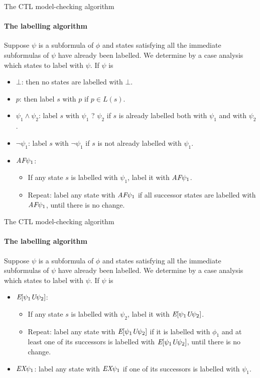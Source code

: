 \begin{frame}{The CTL model-checking algorithm}
	\framesubtitle{The labelling algorithm}
	Suppose $\psi$ is a subformula of $\phi$ and states satisfying all the immediate subformulas of $\psi$ have already been labelled. We determine by a case analysis which states to label with $\psi$. If $\psi$ is
	
	\begin{itemize}
		\item
		{
			$\bot$: then no states are labelled with $\bot$.
			\pause
		}
		\item
		{
			$p$: then label $s$ with $p$ if $p \in L(s)$.
			\pause
		}
		\item
		{
			$\psi_{1} \land \psi_{2}$: label $s$ with $\psi_{1}$ ? $\psi_{2}$ if $s$ is already labelled both with $\psi_{1}$ and with $\psi_{2}$.
			\pause
		}
		\item
		{
			$\neg \psi_{1}$: label $s$ with $\neg \psi_{1}$ if $s$ is not already labelled with $\psi_{1}$.
			\pause
		}
		\item
		{
			$\textit{A}\textit{F} \psi_{1}$:
			\begin{itemize}
				\item If any state $s$ is labelled with $\psi_{1}$, label it with $\textit{A}\textit{F} \psi_{1}$.
				\item Repeat: label any state with $\textit{A}\textit{F} \psi_{1}$ if all successor states are labelled with $\textit{A}\textit{F} \psi_{1}$, until there is no change.
			\end{itemize} 
		}
	\end{itemize} 
\end{frame}

\begin{frame}{The CTL model-checking algorithm}
	\framesubtitle{The labelling algorithm}
	Suppose $\psi$ is a subformula of $\phi$ and states satisfying all the immediate subformulas of $\psi$ have already been labelled. We determine by a case analysis which states to label with $\psi$. If $\psi$ is
	
	\begin{itemize}
		\item
		{
			$\textit{E}[\psi_{1} \textit{U} \psi_{2}]$:
			\begin{itemize}
				\item If any state $s$ is labelled with $\psi_{2}$, label it with $\textit{E}[\psi_{1} \textit{U} \psi_{2}]$.
				\item Repeat: label any state with $\textit{E}[\psi_{1} \textit{U} \psi_{2}]$ if it is labelled with $\phi_{1}$ and at least
				one of its successors is labelled with $\textit{E}[\psi_{1} \textit{U} \psi_{2}]$, until there is no change.
			\end{itemize}
			\pause
		}
		\item
		{
			$\textit{E}\textit{X} \psi_{1}$: label any state with $\textit{E}\textit{X} \psi_{1}$ if one of its successors is labelled with $\psi_{1}$.
		}
	\end{itemize}
\end{frame}

